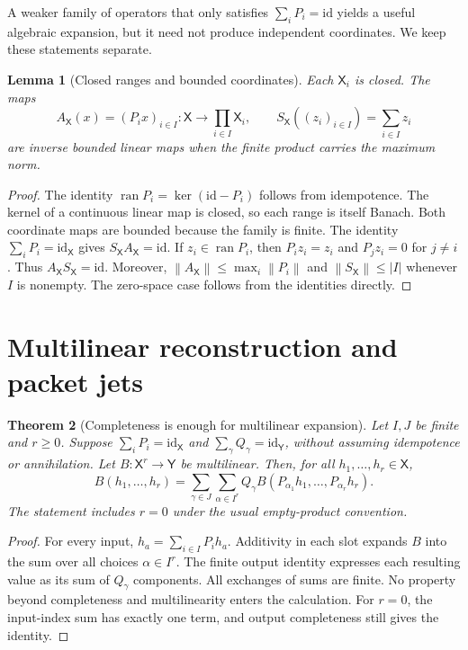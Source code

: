 \documentclass[11pt]{article}
\newtheorem{theorem}{Theorem}[section]
\newtheorem{lemma}[theorem]{Lemma}
\theoremstyle{remark}\newtheorem{remark}[theorem]{Remark}
\newcommand{\X}{\mathsf X}\newcommand{\Y}{\mathsf Y}\newcommand{\Z}{\mathsf Z}
\newcommand{\norm}[1]{\left\lVert#1\right\rVert}
\newcommand{\id}{\mathrm{id}}
\newcommand{\op}{\operatorname}
\begin{document}
A weaker family of operators that only satisfies $\sum_iP_i=\id$ yields a useful algebraic expansion, but it need not produce independent coordinates. We keep these statements separate.

\begin{lemma}[Closed ranges and bounded coordinates]\label{lem:closed}
Each $\X_i$ is closed. The maps
\[
A_{\X}(x)=(P_i x)_{i\in I}:\X\longrightarrow\prod_{i\in I}\X_i,
\qquad S_{\X}((z_i)_{i\in I})=\sum_{i\in I}z_i
\]
are inverse bounded linear maps when the finite product carries the maximum norm.
\end{lemma}
\begin{proof}
The identity $\op{ran}P_i=\ker(\id-P_i)$ follows from idempotence. The kernel of a continuous linear map is closed, so each range is itself Banach. Both coordinate maps are bounded because the family is finite. The identity $\sum_iP_i=\id_{\X}$ gives $S_{\X}A_{\X}=\id$. If $z_i\in\op{ran}P_i$, then $P_i z_i=z_i$ and $P_j z_i=0$ for $j\ne i$. Thus $A_{\X}S_{\X}=\id$. Moreover,
$\norm{A_{\X}}\le\max_i\norm{P_i}$ and
$\norm{S_{\X}}\le |I|$ whenever $I$ is nonempty. The zero-space case follows from the identities directly.
\end{proof}

\section{Multilinear reconstruction and packet jets}
\begin{theorem}[Completeness is enough for multilinear expansion]\label{thm:reconstruction}
Let $I,J$ be finite and $r\ge0$. Suppose $\sum_iP_i=\id_{\X}$ and $\sum_\gamma Q_\gamma=\id_{\Y}$, without assuming idempotence or annihilation. Let $B:\X^r\to\Y$ be multilinear. Then, for all $h_1,\ldots,h_r\in\X$,
\begin{equation}\label{eq:recon}
B(h_1,\ldots,h_r)=\sum_{\gamma\in J}\sum_{\alpha\in I^r}
Q_\gamma B(P_{\alpha_1}h_1,\ldots,P_{\alpha_r}h_r).
\end{equation}
The statement includes $r=0$ under the usual empty-product convention.
\end{theorem}
\begin{proof}
For every input, $h_a=\sum_{i\in I}P_i h_a$. Additivity in each slot expands $B$ into the sum over all choices $\alpha\in I^r$. The finite output identity expresses each resulting value as its sum of $Q_\gamma$ components. All exchanges of sums are finite. No property beyond completeness and multilinearity enters the calculation. For $r=0$, the input-index sum has exactly one term, and output completeness still gives the identity.
\end{proof}
\end{document}
